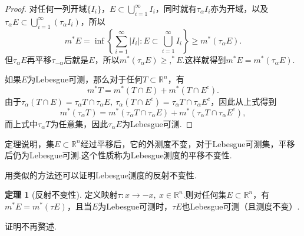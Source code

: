\documentclass[lang=cn,12pt]{ctexart}
\theoremstyle{definition}
\newtheorem{theorem}{定理}
\theoremstyle{plain}
\begin{document}
\begin{proof}
	对任何一列开域$\{I_i\}$，$E\subset\bigcup\limits_{i=1}^{\infty}I_i$，同时就有$\tau_\alpha I_i$亦为开域，以及$\tau_\alpha E\subset\bigcup\limits_{i=1}^{\infty}(\tau_\alpha I_i)$，所以
	$$m^*E=\inf\left\{\sum_{i=1}^{\infty}|I_i|:E\subset\bigcup\limits_{i=1}^{\infty}I_i\right\}\geqslant m^*(\tau_\alpha E).$$
	但$\tau_\alpha E$再平移$\tau_{-\alpha}$后就是$E$，所以$m^*(\tau_\alpha E)\geqslant ,^*E$.这样就得到$m^*E=m^*(\tau_\alpha E)$.
	
	如果$E$为Lebesgue可测，那么对于任何$T\subset\mathbb{R}^n$，有
	$$m^*T=m^*(T\cap E)+m^*(T\cap E^c).$$
	由于$\tau_\alpha(T\cap E)=\tau_\alpha T\cap\tau_\alpha E,\ \tau_\alpha(T\cap E^c)=\tau_\alpha T\cap\tau_\alpha E^c$，因此从上式得到
	$$m^*(\tau_\alpha T)=m^*(\tau_\alpha T\cap\tau_\alpha E)+m^*(\tau_\alpha T\cap\tau_\alpha E^c),$$
	而上式中$\tau_\alpha T$为任意集，因此$\tau_\alpha E$为Lebesgue可测.
\end{proof}
定理说明，集$E\subset\mathbb{R}^n$经过平移后，它的外测度不变，对于Lebesgue可测集，平移后仍为Lebesgue可测.这个性质称为Lebesgue测度的平移不变性.

用类似的方法还可以证明Lebesgue测度的反射不变性.
\begin{theorem}[反射不变性]
	定义映射$\tau:x\to -x,\ x\in\mathbb{R}^n$.则对任何集$E\subset\mathbb{R}^n$，有$m^*E=m^*(\tau E)$，且当$E$为Lebesgue可测时，$\tau E$也Lebesgue可测（且测度不变）.
\end{theorem}
证明不再赘述.
\end{document}
